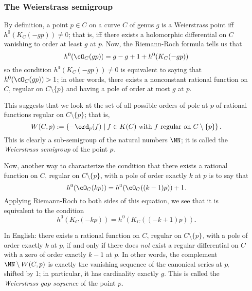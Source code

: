 \subsubsection{The Weierstrass semigroup} 

By definition, a point $p \in C$ on a curve $C$ of genus $g$ is a Weierstrass point iff $h^0(K_C(-gp)) \neq 0$; that is, iff there exists a holomorphic differential on $C$ vanishing to order at least $g$ at $p$. Now, the Riemann-Roch formula tells us that
$$
h^0(\cO_C(gp)) = g - g + 1 + h^0(K_C(-gp))
$$
so the condition $h^0(K_C(-gp)) \neq 0$ is equivalent to saying that $h^0(\cO_C(gp)) > 1$; in other words, there exists a nonconstant rational function on $C$, regular on $C \setminus \{p\}$ and having a pole of order at most $g$ at $p$.

This suggests that we look at the set of all possible orders of pole at $p$ of rational functions regular on $C \setminus \{p\}$; that is,
$$
W(C,p) := \left\{ -\ord_p(f) \mid f \in K(C) \text{ with $f$ regular on } C \setminus \{p\} \right\}.
$$
This is clearly a sub-semigroup of the natural numbers $\NN$; it is called the \emph{Weierstrass semigroup} of the point $p$.  

Now, another way to characterize the condition that there exists a rational function on $C$, regular on $C \setminus \{p\}$, with a pole of order exactly $k$ at $p$ is to say that
$$
h^0(\cO_C(kp)) = h^0(\cO_C((k-1)p)) + 1.
$$
Applying Riemann-Roch to both sides of this equation, we see that it is equivalent to the condition
$$
h^0(K_C(-kp)) = h^0(K_C((-k+1)p)).
$$

In English: there exists a rational function on $C$, regular on $C \setminus \{p\}$, with a pole of order exactly $k$ at $p$, if and only if there does \emph{not} exist a regular differential on $C$ with a zero of order exactly $k-1$ at $p$.
 In other words, the complement $\NN \setminus W(C,p)$ is exactly the vanishing sequence of the canonical series at $p$, shifted by 1; in particular, it has cardinality  exactly $g$. This is called the \emph{Weierstrass gap sequence} of the point $p$.

